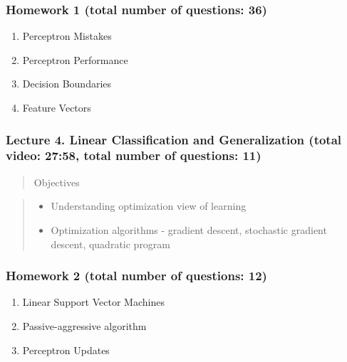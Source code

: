 \documentclass[]{article}
\providecommand{\tightlist}{%
  \setlength{\itemsep}{0pt}\setlength{\parskip}{0pt}}
\begin{document}
\hypertarget{homework-1-total-number-of-questions-36}{%
\subsubsection{Homework 1 (total number of questions:
36)}\label{homework-1-total-number-of-questions-36}}

\begin{enumerate}
\def\labelenumi{\arabic{enumi}.}
\tightlist
\item
  Perceptron Mistakes
\item
  Perceptron Performance
\item
  Decision Boundaries
\item
  Feature Vectors
\end{enumerate}

\hypertarget{lecture-4.-linear-classification-and-generalization-total-video-2758-total-number-of-questions-11}{%
\subsubsection{Lecture 4. Linear Classification and Generalization
(total video: 27:58, total number of questions:
11)}\label{lecture-4.-linear-classification-and-generalization-total-video-2758-total-number-of-questions-11}}

\begin{quote}
Objectives
\end{quote}

\begin{quote}
\begin{itemize}
\tightlist
\item
  Understanding optimization view of learning
\item
  Optimization algorithms - gradient descent, stochastic gradient
  descent, quadratic program
\end{itemize}
\end{quote}

\hypertarget{homework-2-total-number-of-questions-12}{%
\subsubsection{Homework 2 (total number of questions:
12)}\label{homework-2-total-number-of-questions-12}}

\begin{enumerate}
\def\labelenumi{\arabic{enumi}.}
\tightlist
\item
  Linear Support Vector Machines
\item
  Passive-aggressive algorithm
\item
  Perceptron Updates
\end{enumerate}
\end{document}
